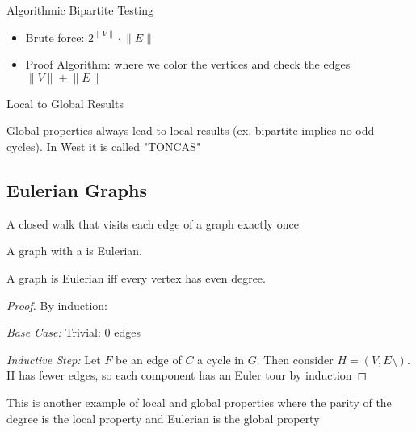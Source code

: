 
\begin{remark}
	Algorithmic Bipartite Testing
	\begin{itemize}
		\item Brute force: \(2^{\lVert V \rVert} \cdot \lVert E \rVert \) 
		\item Proof Algorithm: where we color the vertices and check the edges \(\lVert V \rVert + \lVert E \rVert \) 
	\end{itemize}
\end{remark}

\begin{remark}
	Local to Global Results

	Global properties always lead to local results (ex. bipartite implies no odd cycles). In West it is called "TONCAS"
\end{remark}

\subsection{Eulerian Graphs}

\begin{definition}
	\label{def:euler tour}
	A closed walk that visits each edge of a graph exactly once
\end{definition}

\begin{definition}
	\label{def:eulerian graph}
	A graph with a  is Eulerian.
\end{definition}

\begin{proposition}
	A graph is Eulerian iff every vertex has even degree.
\end{proposition}
\begin{proof}
	By induction:
	
	\emph{Base Case:} Trivial: 0 edges

	\emph{Inductive Step:} Let \(F\) be an edge of \(C\) a cycle in \(G\). Then consider \(H = (V, E\setminus)\). H has fewer edges, so each component has an Euler tour by induction
\end{proof}

\begin{note}
	This is another example of local and global properties where the parity of the degree is the local property and Eulerian is the global property
\end{note} 

